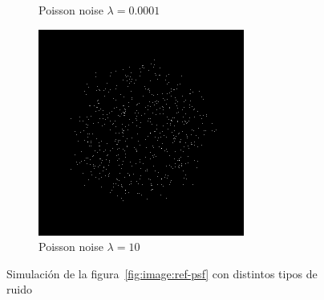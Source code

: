 \documentclass{./packages/optica-article}
\begin{document}
\begin{figure}[hbp]
\begin{center}
\begin{subfigure}[t]{0.25\textwidth}
			\caption{Poisson noise $\lambda = 0.0001$}
		\end{subfigure}
		\quad
		\begin{subfigure}[t]{0.25\textwidth}\centering
			\centering
			\includegraphics[width=\textwidth]{Simulation deconvolution/ref_np_10}
			\caption{Poisson noise $\lambda =  10$}
		\end{subfigure}
		\caption{Simulación de la figura~\ref{fig:image:ref-psf} con distintos tipos de ruido}\label{fig:convolutions}
	\end{center}
\end{figure}
\end{document}
